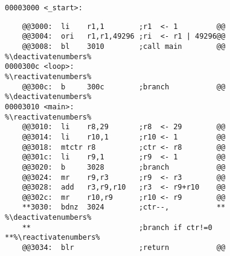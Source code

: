 \documentclass[varwidth]{standalone}
\makeatletter
\let\origthelstnumber\thelstnumber
\newcommand*\deactivatenumbers{%
  \lst@AddToHook{OnNewLine}{%
    \let\thelstnumber\relax%
    \advance\c@lstnumber-\@ne\relax}}
\newcommand*\reactivatenumbers{%
  \lst@AddToHook{OnNewLine}{%
    \let\thelstnumber\origthelstnumber%
    \advance\c@lstnumber\@ne\relax}}
\makeatother
\begin{document}
\scriptsize
\begin{lstlisting}[numbers=none]
00003000 <_start>:
\end{lstlisting}
\vspace{-12pt}
\begin{lstlisting}
    @@3000:  li    r1,1        ;r1  <- 1         @@
    @@3004:  ori   r1,r1,49296 ;ri  <- r1 | 49296@@
    @@3008:  bl    3010        ;call main        @@ %\deactivatenumbers%
0000300c <loop>:                                    %\reactivatenumbers%
    @@300c:  b     300c        ;branch           @@ %\deactivatenumbers%
00003010 <main>:                                    %\reactivatenumbers%
    @@3010:  li    r8,29       ;r8  <- 29        @@
    @@3014:  li    r10,1       ;r10 <- 1         @@
    @@3018:  mtctr r8          ;ctr <- r8        @@
    @@301c:  li    r9,1        ;r9  <- 1         @@
    @@3020:  b     3028        ;branch           @@
    @@3024:  mr    r9,r3       ;r9  <- r3        @@
    @@3028:  add   r3,r9,r10   ;r3  <- r9+r10    @@
    @@302c:  mr    r10,r9      ;r10 <- r9        @@
    **3030:  bdnz  3024        ;ctr--,           ** %\deactivatenumbers%
    **                         ;branch if ctr!=0 **%\reactivatenumbers%
    @@3034:  blr               ;return           @@
\end{lstlisting}
\end{document}
